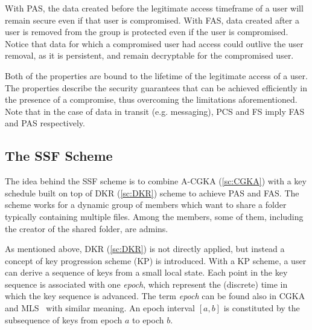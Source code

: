 With PAS, the data created before the legitimate access timeframe of a user
will remain secure even if that user is compromised.
With FAS, data created after a user is removed from the group is protected
even if the user is compromised. Notice that data for which 
a compromised user had access could outlive the user removal,
as it is persistent, and remain decryptable for the compromised user.

Both of the properties are bound to the lifetime of the legitimate access 
of a user.
The properties describe the security guarantees that can be achieved efficiently
in the presence of a compromise,
thus overcoming the limitations aforementioned.
Note that in the case of data in transit (e.g. messaging),
PCS and FS imply FAS and PAS respectively.

\subsection{The SSF Scheme}

The idea behind the SSF scheme is to combine A-CGKA (\cref{sc:CGKA}) with
a key schedule built on top of DKR (\cref{sc:DKR}) scheme 
to achieve PAS and FAS.
The scheme works for a dynamic group of members which want to share a folder
typically containing multiple files. Among the members, some of them,
including the creator of the shared folder, are admins.

As mentioned above, DKR (\cref{sc:DKR}) is not directly applied, 
but instead a concept of key progression scheme (KP) is introduced.
With a KP scheme, a user can derive a sequence of keys from a small local state. 
Each point in the key sequence is associated with one \textit{epoch}, 
which represent the (discrete) time in which the key sequence is advanced.
The term \textit{epoch} can be found also in CGKA and MLS~\cite{rfc9420} with similar meaning.
An epoch interval $[a, b]$ is constituted by the subsequence of keys
from epoch $a$ to epoch $b$.

